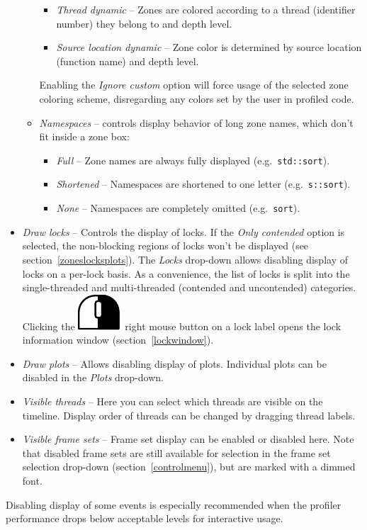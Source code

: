 \documentclass[hidelinks,titlepage,a4paper]{article}
\newcommand{\RMB}{\includegraphics[height=.8\baselineskip]{icons/rmb}}
\begin{document}
\begin{itemize}
\begin{itemize}
\begin{itemize}
\item \emph{Thread dynamic} -- Zones are colored according to a thread (identifier number) they belong to and depth level.
\item \emph{Source location dynamic} -- Zone color is determined by source location (function name) and depth level.
\end{itemize}
Enabling the \emph{Ignore custom} option will force usage of the selected zone coloring scheme, disregarding any colors set by the user in profiled code.
\item \emph{\faBoxOpen{} Namespaces} -- controls display behavior of long zone names, which don't fit inside a zone box:
\begin{itemize}
\item \emph{Full} -- Zone names are always fully displayed (e.g.\ \texttt{std::sort}).
\item \emph{Shortened} -- Namespaces are shortened to one letter (e.g.\ \texttt{s::sort}).
\item \emph{None} -- Namespaces are completely omitted (e.g.\ \texttt{sort}).
\end{itemize}
\end{itemize}
\item \emph{\faLock{} Draw locks} -- Controls the display of locks. If the \emph{Only contended} option is selected, the non-blocking regions of locks won't be displayed (see section~\ref{zoneslocksplots}). The \emph{Locks} drop-down allows disabling display of locks on a per-lock basis. As a convenience, the list of locks is split into the single-threaded and multi-threaded (contended and uncontended) categories. Clicking the \RMB{}~right mouse button on a lock label opens the lock information window (section~\ref{lockwindow}).
\item \emph{\faSignature{} Draw plots} -- Allows disabling display of plots. Individual plots can be disabled in the \emph{Plots} drop-down.
\item \emph{\faRandom{} Visible threads} -- Here you can select which threads are visible on the timeline. Display order of threads can be changed by dragging thread labels.
\item \emph{\faImages{} Visible frame sets} -- Frame set display can be enabled or disabled here. Note that disabled frame sets are still available for selection in the frame set selection drop-down (section~\ref{controlmenu}), but are marked with a dimmed font.
\end{itemize}

Disabling display of some events is especially recommended when the profiler performance drops below acceptable levels for interactive usage.
\end{document}
